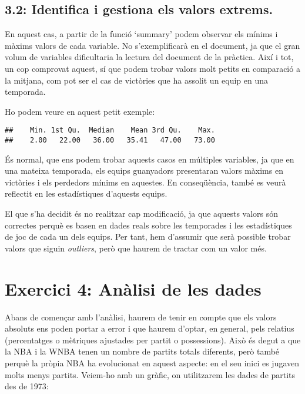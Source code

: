 \documentclass[
]{article}
\begin{document}
\hypertarget{identifica-i-gestiona-els-valors-extrems.}{%
\subsection{3.2: Identifica i gestiona els valors
extrems.}\label{identifica-i-gestiona-els-valors-extrems.}}

En aquest cas, a partir de la funció `summary' podem observar els mínims
i màxims valors de cada variable. No s'exemplificarà en el document, ja
que el gran volum de variables dificultaria la lectura del document de
la pràctica. Així i tot, un cop comprovat aquest, sí que podem trobar
valors molt petits en comparació a la mitjana, com pot ser el cas de
victòries que ha assolit un equip en una temporada.

Ho podem veure en aquest petit exemple:

\begin{verbatim}
##    Min. 1st Qu.  Median    Mean 3rd Qu.    Max. 
##    2.00   22.00   36.00   35.41   47.00   73.00
\end{verbatim}

És normal, que ens podem trobar aquests casos en múltiples variables, ja
que en una mateixa temporada, els equips guanyadors presentaran valors
màxims en victòries i els perdedors mínims en aquestes. En conseqüència,
també es veurà reflectit en les estadístiques d'aquests equips.

El que s'ha decidit és no realitzar cap modificació, ja que aquests
valors són correctes perquè es basen en dades reals sobre les temporades
i les estadístiques de joc de cada un dels equips. Per tant, hem
d'assumir que serà possible trobar valors que siguin \emph{outliers},
però que haurem de tractar com un valor més.

\hypertarget{exercici-4-anuxe0lisi-de-les-dades}{%
\section{Exercici 4: Anàlisi de les
dades}\label{exercici-4-anuxe0lisi-de-les-dades}}

Abans de començar amb l'anàlisi, haurem de tenir en compte que els
valors absoluts ens poden portar a error i que haurem d'optar, en
general, pels relatius (percentatges o mètriques ajustades per partit o
possessions). Això és degut a que la NBA i la WNBA tenen un nombre de
partits totals diferents, però també perquè la pròpia NBA ha evolucionat
en aquest aspecte: en el seu inici es jugaven molts menys partits.
Veiem-ho amb un gràfic, on utilitzarem les dades de partits des de 1973:
\end{document}
